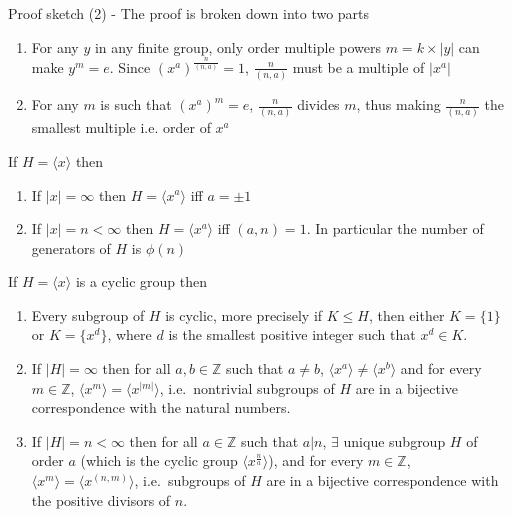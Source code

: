 \documentclass[titlepage, 12pt]{book}
\begin{document}
Proof sketch (2) - The proof is broken down into two parts
\begin{enumerate}
    \item For any $y$ in any finite group, only order multiple powers $m =
        k\times |y|$ can make $y^m = e$. Since $(x^a)^{\frac{n}{(n, a)}} = 1$,
        $\frac{n}{(n, a)}$ must be a multiple of $|x^a|$ 
    \item For any $m$ is such that $(x^a)^m = e$, $\frac{n}{(n, a)}$ divides
        $m$, thus making $\frac{n}{(n, a)}$ the smallest multiple i.e. order of
        $x^a$
\end{enumerate}

\begin{proposition}{}{}
    If $H = \langle x\rangle$ then
        \begin{enumerate}
            \item If $|x| = \infty$ then $H = \langle x^a\rangle$ iff $a =
                \pm 1$
            \item If $|x| = n < \infty$ then $H = \langle x^a\rangle$ iff $(a, n) =
                1$. In particular the number of generators of $H$ is $\phi(n)$
        \end{enumerate}
\end{proposition}
\begin{proposition}{}{}
    If $H = \langle x\rangle$ is a cyclic group then
        \begin{enumerate}
            \item Every subgroup of $H$ is cyclic, more precisely if $K\le H$,
                then either $K = \{1\}$ or $K = \{x^d\}$, where $d$ is the
                smallest positive integer such that $x^d\in K$.
            \item If $|H| = \infty$ then for all $a, b\in\mathbb{Z}$ such that
                $a\neq b$, $\langle x^a\rangle\neq\langle x^b\rangle$ and for
                every $m\in\mathbb{Z}$, $\langle x^m\rangle = \langle
                x^{|m|}\rangle$, i.e.\ nontrivial subgroups of $H$ are in a
                bijective correspondence with the natural numbers.
            \item If $|H| = n < \infty$ then for all $a\in\mathbb{Z}$ such that
                $a|n$, $\exists$ unique subgroup $H$ of order $a$ (which is the
                cyclic group $\langle x^{\frac{n}{a}}\rangle$), and for every
                $m\in\mathbb{Z}$, $\langle x^m\rangle = \langle x^{(n,
                m)}\rangle$, i.e.\ subgroups of $H$ are in a bijective
                correspondence with the positive divisors of $n$.
        \end{enumerate}
\end{proposition}
\end{document}
